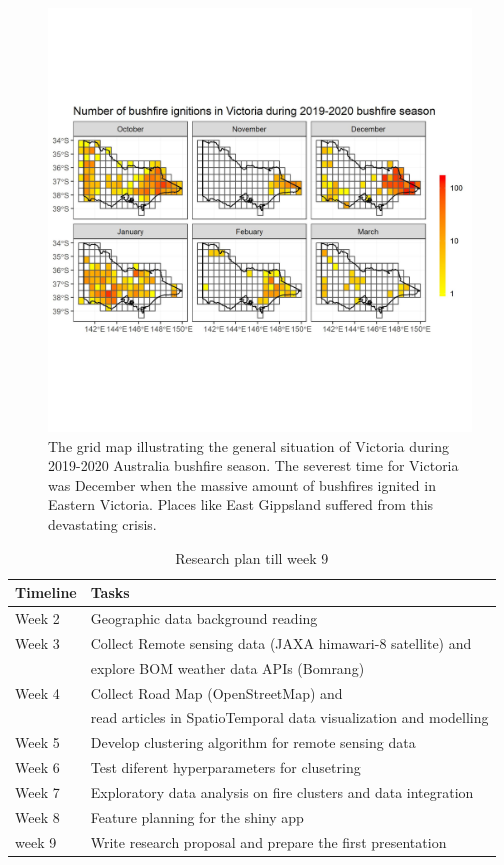 \documentclass[11pt,a4paper,]{article}
\begin{document}
\begin{figure}
\centering
\includegraphics[width=5.20833in]{figures/number_of_ignitions.jpg}
\caption{The grid map illustrating the general situation of Victoria
during 2019-2020 Australia bushfire season. The severest time for
Victoria was December when the massive amount of bushfires ignited in
Eastern Victoria. Places like East Gippsland suffered from this
devastating crisis. \label{fig:overview}}
\end{figure}

\begin{table}[!h]

\caption{\label{tab:timeline1}Research plan till week 9}
\centering
\begin{tabular}{ll}
\toprule
Timeline & Tasks\\
\midrule
Week 2 & Geographic data background reading\\
Week 3 & Collect Remote sensing data (JAXA himawari-8 satellite) and\\
 & explore BOM weather data APIs (Bomrang)\\
Week 4 & Collect Road Map (OpenStreetMap) and\\
 & read articles in SpatioTemporal data visualization and modelling\\
\addlinespace
Week 5 & Develop clustering algorithm for remote sensing data\\
Week 6 & Test diferent hyperparameters for clusetring\\
Week 7 & Exploratory data analysis on fire clusters and data integration\\
Week 8 & Feature planning for the shiny app\\
week 9 & Write research proposal and prepare the first presentation\\
\bottomrule
\end{tabular}
\end{table}
\end{document}

